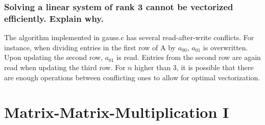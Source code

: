 \documentclass[11pt]{article}
\begin{document}
\subsubsection*{Solving a linear system of rank 3 cannot be vectorized efficiently. Explain why.}
The algorithm implemented in gauss.c has several read-after-write conflicts. For instance, when dividing entries in the first row of A by $a_{00}$, $a_{01}$ is overwritten. Upon updating the second row, $a_{01}$ is read. Entries from the second row are again read when updating the third row. For $n$ higher than 3, it is possible that there are enough operations between conflicting ones to allow for optimal vectorization.
\section{Matrix-Matrix-Multiplication I}
\end{document}
